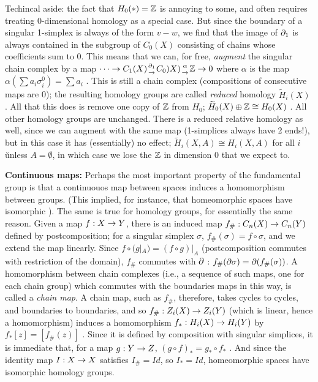 \msk

Techincal aside: the fact that $H_0(*)={\Bbb Z}$ is annoying to some,
and often requires treating 0-dimensional homology as a special case. 
But since the boundary of a singular 1-simplex is always of the form $v-w$, we find that the 
image of $\partial_1$ is always contained in the subgroup of $C_0(X)$ consisting
of chains whose coefficients sum to 0. This means that we can, for free, 
{\it augment} the singular chain complex by a map
$\cdots \rightarrow C_1(X) {\partial_1\atop\rightarrow}C_0)X) {\alpha\atop \rightarrow} {\Bbb Z} \rightarrow 0$
where $\alpha$ is the map $\alpha(\sum a_i\sigma_i^0) = \sum a_i$ . This 
is still a chain complex (compositions of consecutive maps are 0); the resulting
homology groups are called {\it reduced} homology $\widetilde{H}_i(X)$ . 
All that this does is remove one copy of ${\Bbb Z}$ from 
$H_0$; $\widetilde{H}_0(X)\oplus {\Bbb Z} \cong H_0(X)$ . All other
homology groups are unchanged. There is a reduced relative homology 
as well, since we can augment with the same map (1-simplices always have 2 ends!),
but in this case it has (essentially) no effect; $\widetilde{H}_i(X,A)\cong H_i(X,A)$
for all $i$ \u{unless} $A=\emptyset$, in which case we lose the ${\Bbb Z}$ in
dimension 0 that we expect to. 

\vfill
\eject

{\bf Continuous maps:} Perhaps the most important property of the fundamental group is that a continuouos map 
between spaces induces a homomorphism between groups. (This implied, for instance,
that homeomorphic spaces have isomorphic \mpu ). The same is true for homology groups, 
for essentially the same reason. Given a map $f:X\rightarrow Y$, there is an induced map $f_\#:C_n(X)\rightarrow C_n(Y)$
defined by postcomposition; for a singular simplex $\sigma$, $f_\#(\sigma) = f\circ\sigma$, and we extend
the map linearly. Since $f\circ(g|_A) = (f\circ g)|_A$ (postcomposition commutes with restriction of the domain),
$f_\#$ commutes with $\partial$ : $f_\#(\partial \sigma) = \partial(f_\#(\sigma))$. A homomorphism between
chain complexes (i.e., a sequence of such maps, one for each chain group) which commutes with the 
boundaries maps in this way, is called a {\it chain map}.
A chain map, such as $f_\#$, therefore, takes cycles to cycles,
and boundaries to boundaries, and so $f_\#:Z_i(X)\rightarrow Z_i(Y)$ (which is linear, hence a homomorphism)
induces a homomorphism $f_*:H_i(X)\rightarrow H_i(Y)$ by $f_*[z] = [f_\#(z)]$ . 
Since it is defined by composition with singular simplices, it is 
immediate that, for a map $g:Y\rightarrow Z$, $(g\circ f)_*=g_*\circ f_*$ . And since the identity map $I:X\rightarrow X$
satisfies $I_\#=Id$, so $I_*=Id$, homeomorphic spaces have isomorphic homology groups.

